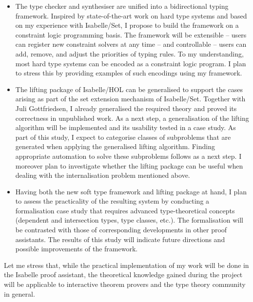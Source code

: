 \documentclass[a4paper, 12pt]{article}
\theoremstyle{plain}
\theoremstyle{definition}
\begin{document}
\begin{itemize}
  \item The type checker and synthesiser are unified into a bidirectional typing framework.
    Inspired by state-of-the-art work on hard type systems
    \cite{de2015elaboration,guidi2019implementing,mazzoli2016type,tassi2012bi,vytiniotis2011outsidein}
    and based on my experience with Isabelle/Set,
    I propose to build the framework on a constraint logic programming basis.
    The framework will be extensible -- users can register new constraint solvers at any time --
    and controllable -- users can add, remove, and adjust the priorities of typing rules.
    To my understanding,
    most hard type systems can be encoded as a constraint logic program.
    I plan to stress this by providing examples of such encodings using my framework.
  \item The lifting package of Isabelle/HOL can be generalised to support the cases arising as part of the set extension mechanism of Isabelle/Set.
    Together with Juli Gottfriedsen,
    I already generalised the required theory and proved its correctness in unpublished work.
    As a next step,
    a generalisation of the lifting algorithm will be implemented and its
    usability tested in a case study.
    As part of this study,
    I expect to categorise classes of subproblems that are generated when applying the generalised lifting algorithm.
    Finding appropriate automation to solve these subproblems follows as a next step.
    I moreover plan to investigate whether the lifting package can be useful when dealing with the internalisation problem mentioned above.
  \item Having both the new soft type framework and lifting package at hand,
    I plan to assess the practicality of the resulting system
    by conducting a formalisation case study that
    requires advanced type-theoretical concepts (dependent and intersection types, type classes, etc.).
    The formalisation will be contrasted with those of corresponding developments in other proof assistants.
    The results of this study will indicate future directions and possible improvements of the framework.
\end{itemize}
Let me stress that,
while the practical implementation of my work will be done in the Isabelle proof assistant,
the theoretical knowledge gained during the project will be applicable to interactive theorem provers and the type theory community in general.
\end{document}
